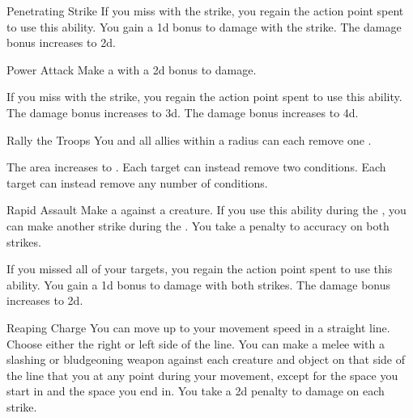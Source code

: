 {\begin{ability}{Penetrating Strike}
                \rankline
                 If you miss with the strike, you regain the action point spent to use this ability.
                 You gain a \plus1d bonus to damage with the strike.
                 The damage bonus increases to \plus2d.
            \end{ability}

            \begin{ability}{Power Attack}
                Make a  with a \plus2d bonus to damage.

                \rankline
                 If you miss with the strike, you regain the action point spent to use this ability.
                 The damage bonus increases to \plus3d.
                 The damage bonus increases to \plus4d.
            \end{ability}

            \begin{ability}{Rally the Troops}
                You and all allies within a \areamed radius can each remove one .

                \rankline
                 The area increases to \arealarge.
                 Each target can instead remove two conditions.
                 Each target can instead remove any number of conditions.
            \end{ability}

            \begin{ability}{Rapid Assault}
                Make a  against a creature.
                If you use this ability during the , you can make another strike during the .
                You take a  penalty to accuracy on both strikes.

                \rankline
                 If you missed all of your targets, you regain the action point spent to use this ability.
                 You gain a \plus1d bonus to damage with both strikes.
                 The damage bonus increases to \plus2d.
            \end{ability}

            \begin{ability}{Reaping Charge}
                You can move up to your movement speed in a straight line.
                Choose either the right or left side of the line.
                You can make a melee  with a slashing or bludgeoning weapon against each creature and object on that side of the line that you  at any point during your movement, except for the space you start in and the space you end in.
                You take a \minus2d penalty to damage on each strike.


\end{ability}}
